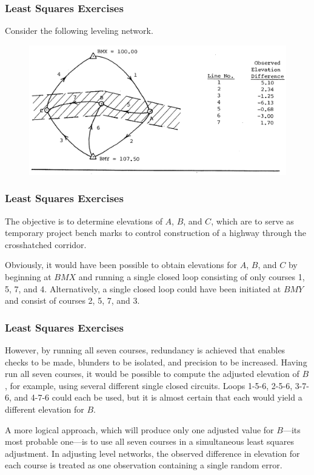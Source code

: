\documentclass[xcolor=dvipsnames]{beamer}
\begin{document}
\begin{frame}
  \frametitle{Least Squares Exercises}
  {\ubung} Consider the following leveling network. 
    \begin{figure}[h]
    \includegraphics[scale=0.26]{./diagrams/levelingnetwork.png}
  \end{figure}
\end{frame}

\begin{frame}
  \frametitle{Least Squares Exercises}
  The objective is to determine elevations of $A$, $B$, and $C$, which
  are to serve as temporary project bench marks to control
  construction of a highway through the crosshatched corridor.

\bigskip

  Obviously, it would have been possible to obtain elevations for $A$,
  $B$, and $C$ by beginning at $BMX$ and running a single closed loop
  consisting of only courses 1, 5, 7, and 4. Alternatively, a single
  closed loop could have been initiated at $BMY$ and consist of courses
  2, 5, 7, and 3.
\end{frame}

\begin{frame}
  \frametitle{Least Squares Exercises}
  However, by running all seven courses, redundancy is achieved that
  enables checks to be made, blunders to be isolated, and precision to
  be increased. Having run all seven courses, it would be possible to
  compute the adjusted elevation of $B$, for example, using several
  different single closed circuits. Loops 1-5-6, 2-5-6, 3-7-6, and
  4-7-6 could each be used, but it is almost certain that each would
  yield a different elevation for $B$.

\bigskip

  A more logical approach, which will produce only one adjusted value
  for $B$---its most probable one---is to use all seven courses in a
  simultaneous least squares adjustment. In adjusting level networks,
  the observed difference in elevation for each course is treated as
  one observation containing a single random error.
\end{frame}
\end{document}
